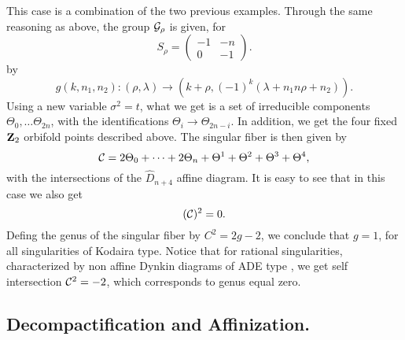 This case is a combination of the two previous examples. Through the same 
reasoning as above, the group ${\cal G}_{\rho}$ is given, for
\begin{equation}
S_{\rho} = \left( \begin{array}{cc} -1 & -n \\ 0 & -1 \end{array} \right).
\label{eq:r40}
\end{equation}
by 
\begin{equation}
g(k,n_1,n_2) : (\rho,\lambda) \rightarrow (k+\rho, (-1)^k (\lambda +n_1 n \rho +n_2)).
\label{eq:r41}
\end{equation}
Using a new variable $\sigma^2=t$, what we get is a set of irreducible components 
$\Theta_0, \ldots \Theta_{2n}$, with the identifications $\Theta_i 
\rightarrow \Theta_{2n-i}$. In addition, we get the four fixed ${\bf Z}_2$ 
orbifold points described above. The singular fiber is then given by
\begin{equation}
{\cal C} = 2 \Theta_0 + \cdots + 2 \Theta_n + \Theta^1 + \Theta^2 + 
\Theta^3 + \Theta^4,
\label{eq:r42}
\end{equation}
with the intersections of the $\hat{D}_{n+4}$ affine diagram. It is easy to see 
that in this case we also get
\begin{equation}
({\cal C})^2 =0.
\label{eq:r43}
\end{equation}
Defing the genus of the singular fiber by $C^2=2g-2$, we conclude that $g=1$, 
for all singularities of Kodaira type. Notice that for rational singularities, 
characterized by non affine Dynkin diagrams of ADE type \cite{Artin}, we get self intersection 
${\cal C}^2=-2$, which corresponds to genus equal zero.

\subsection{Decompactification and Affinization.}

